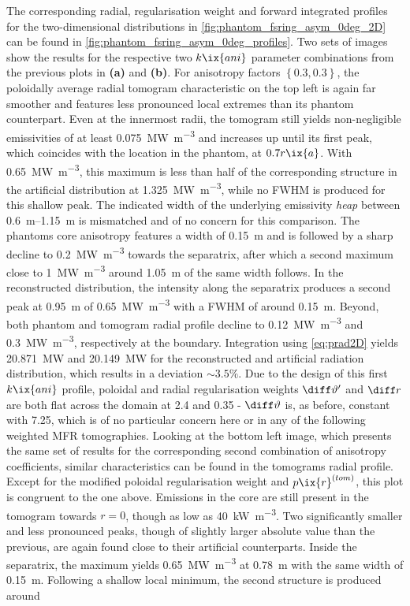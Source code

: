                 The corresponding radial, regularisation weight and forward integrated profiles for the two-dimensional distributions in \cref{fig:phantom_fsring_asym_0deg_2D} can be found in \cref{fig:phantom_fsring_asym_0deg_profiles}. Two sets of images show the results for the respective two $k\ix{ani}$ parameter combinations from the previous plots in \textbf{(a)} and \textbf{(b)}. For anisotropy factors $\left\{0.3, 0.3\right\}$, the poloidally average radial tomogram characteristic on the top left is again far smoother and features less pronounced local extremes than its phantom counterpart. Even at the innermost radii, the tomogram still yields non-negligible emissivities of at least \SI{0.075}{\mega\watt\per\cubic\meter} and increases up until its first peak, which coincides with the location in the phantom, at $0.7r\ix{a}$. With \SI{0.65}{\mega\watt\per\cubic\meter}, this maximum is less than half of the corresponding structure in the artificial distribution at \SI{1.325}{\mega\watt\per\cubic\meter}, while no FWHM is produced for this shallow peak. The indicated width of the underlying emissivity \textit{heap} between \SIrange{0.6}{1.15}{\meter} is mismatched and of no concern for this comparison. The phantoms core anisotropy features a width of \SI{0.15}{\meter} and is followed by a sharp decline to \SI{0.2}{\mega\watt\per\cubic\meter} towards the separatrix, after which a second maximum close to \SI{1}{\mega\watt\per\cubic\meter} around \SI{1.05}{\meter} of the same width follows. In the reconstructed distribution, the intensity along the separatrix produces a second peak at \SI{0.95}{\meter} of \SI{0.65}{\mega\watt\per\cubic\meter} with a FWHM of around \SI{0.15}{\meter}. Beyond, both phantom and tomogram radial profile decline to \SI{0.12}{\mega\watt\per\cubic\meter} and \SI{0.3}{\mega\watt\per\cubic\meter}, respectively at the boundary. Integration using \cref{eq:prad2D} yields \SI{20.871}{\mega\watt} and \SI{20.149}{\mega\watt} for the reconstructed and artificial radiation distribution, which results in a deviation $\sim3.5\%$. Due to the design of this first $k\ix{ani}$ profile, poloidal and radial regularisation weights $\diff\vartheta^{\prime}$ and $\diff r$ are both flat across the domain at \SI{2.4}{\arbitraryunit} and \SI{0.35}{\arbitraryunit} - $\diff\vartheta$ is, as before, constant with \SI{7.25}{\arbitraryunit}, which is of no particular concern here or in any of the following weighted MFR tomographies. Looking at the bottom left image, which presents the same set of results for the corresponding second combination of anisotropy coefficients, similar characteristics can be found in the tomograms radial profile. Except for the modified poloidal regularisation weight and $p\ix{r}^{\left(tom\right)}$, this plot is congruent to the one above. Emissions in the core are still present in the tomogram towards $r=0$, though as low as \SI{40}{\kilo\watt\per\cubic\meter}. Two significantly smaller and less pronounced peaks, though of slightly larger absolute value than the previous, are again found close to their artificial counterparts. Inside the separatrix, the maximum yields \SI{0.65}{\mega\watt\per\cubic\meter} at \SI{0.78}{\meter} with the same width of \SI{0.15}{\meter}. Following a shallow local minimum, the second structure is produced around 